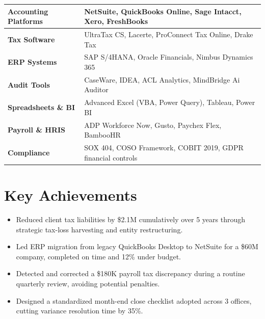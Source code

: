 \documentclass[11pt,letterpaper]{article}
\renewcommand{\arraystretch}{1.15}
\begin{document}
\begin{center}
\renewcommand{\arraystretch}{1.35}
\begin{tabular}{@{}>{\bfseries}l l@{}}
  \toprule
  Accounting Platforms & NetSuite, QuickBooks Online, Sage Intacct, Xero, FreshBooks \\
  \midrule
  Tax Software         & UltraTax CS, Lacerte, ProConnect Tax Online, Drake Tax \\
  \midrule
  ERP Systems          & SAP S/4HANA, Oracle Financials, Nimbus Dynamics 365 \\
  \midrule
  Audit Tools          & CaseWare, IDEA, ACL Analytics, MindBridge Ai Auditor \\
  \midrule
  Spreadsheets \& BI   & Advanced Excel (VBA, Power Query), Tableau, Power BI \\
  \midrule
  Payroll \& HRIS      & ADP Workforce Now, Gusto, Paychex Flex, BambooHR \\
  \midrule
  Compliance           & SOX 404, COSO Framework, COBIT 2019, GDPR financial controls \\
  \bottomrule
\end{tabular}
\end{center}

\vspace{4pt}

\section{Key Achievements}

\begin{tcolorbox}[
  colback=lightgray,
  colframe=lightgray,
  boxrule=0pt,
  arc=4pt,
  left=10pt,
  right=10pt,
  top=8pt,
  bottom=8pt,
  boxsep=0pt,
]

\begin{minipage}[t]{0.48\textwidth}
  \raggedright
  \begin{itemize}[leftmargin=*,nosep,itemsep=3pt]
    \item Reduced client tax liabilities by \$2.1M cumulatively over 5 years through strategic tax-loss harvesting and entity restructuring.
    \item Led ERP migration from legacy QuickBooks Desktop to NetSuite for a \$60M company, completed on time and 12\% under budget.
  \end{itemize}
\end{minipage}%
\hfill
\begin{minipage}[t]{0.48\textwidth}
  \raggedright
  \begin{itemize}[leftmargin=*,nosep,itemsep=3pt]
    \item Detected and corrected a \$180K payroll tax discrepancy during a routine quarterly review, avoiding potential penalties.
    \item Designed a standardized month-end close checklist adopted across 3 offices, cutting variance resolution time by 35\%.
  \end{itemize}
\end{minipage}

\end{tcolorbox}
\end{document}
